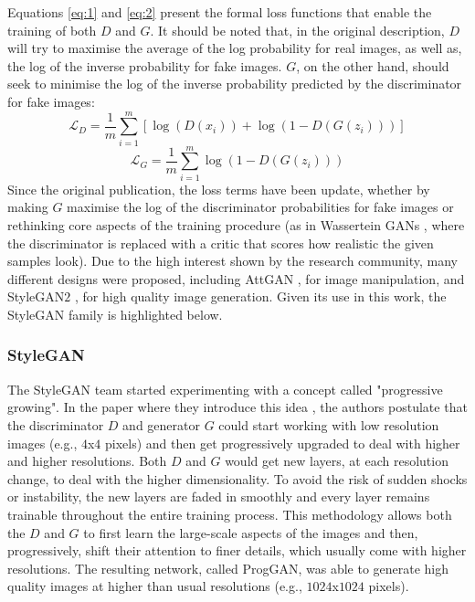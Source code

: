 Equations \ref{eq:1} and \ref{eq:2} present the formal loss functions that enable the training of both $D$ and $G$. It should be noted that, in the original description, $D$ will try to maximise the average of the log probability for real images, as well as, the log of the inverse probability for fake images. $G$, on the other hand, should seek to minimise the log of the inverse probability predicted by the discriminator for fake images:
\begin{equation}
    \mathcal{L}_D = \frac{1}{m}\sum_{i = 1}^{m}[\log(D(x_i)) + \log(1 - D(G(z_i)))]
    \label{eq:1}
\end{equation}
\begin{equation}
    \mathcal{L}_G = \frac{1}{m}\sum_{i = 1}^{m}\log(1 - D(G(z_i)))
    \label{eq:2}
\end{equation}
Since the original publication, the loss terms have been update, whether by making $G$ maximise the log of the discriminator probabilities for fake images or rethinking core aspects of the training procedure (as in Wassertein \ac{GAN}s \cite{wgan}, where the discriminator is replaced with a critic that scores how realistic the given samples look). Due to the high interest shown by the research community, many different designs were proposed, including Att\ac{GAN} \cite{attgan}, for image manipulation, and Style\ac{GAN}$2$ \cite{stylegan2}, for high quality image generation. Given its use in this work, the Style\ac{GAN} family is highlighted below.

\subsubsection{Style\ac{GAN}}
\label{subsubsec:chap2_stylegan_2}

The Style\ac{GAN} team started experimenting with a concept called "progressive growing". In the paper where they introduce this idea \cite{proggan}, the authors postulate that the discriminator $D$ and generator $G$ could start working with low resolution images (e.g., $4$x$4$ pixels) and then get progressively upgraded to deal with higher and higher resolutions. Both $D$ and $G$ would get new layers, at each resolution change, to deal with the higher dimensionality. To avoid the risk of sudden shocks or instability, the new layers are faded in smoothly and every layer remains trainable throughout the entire training process. This methodology allows both the $D$ and $G$ to first learn the large-scale aspects of the images and then, progressively, shift their attention to finer details, which usually come with higher resolutions. The resulting network, called Prog\ac{GAN}, was able to generate high quality images at higher than usual resolutions (e.g., $1024$x$1024$ pixels).\\

